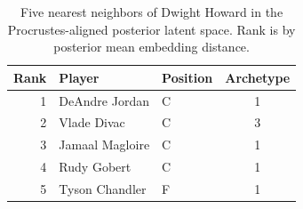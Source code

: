 \begin{table}[htbp]
  \centering\small
  \begin{tabular}{rllc}
    \toprule
    Rank & Player & Position & Archetype \\
    \midrule
    1 & DeAndre Jordan & C & 1 \\
    2 & Vlade Divac & C & 3 \\
    3 & Jamaal Magloire & C & 1 \\
    4 & Rudy Gobert & C & 1 \\
    5 & Tyson Chandler & F & 1 \\
    \bottomrule
  \end{tabular}
  \caption{Five nearest neighbors of Dwight Howard in the Procrustes-aligned posterior latent space. Rank is by posterior mean embedding distance.}
  \label{tab:Dwight_Howard_neighbors}
\end{table}

